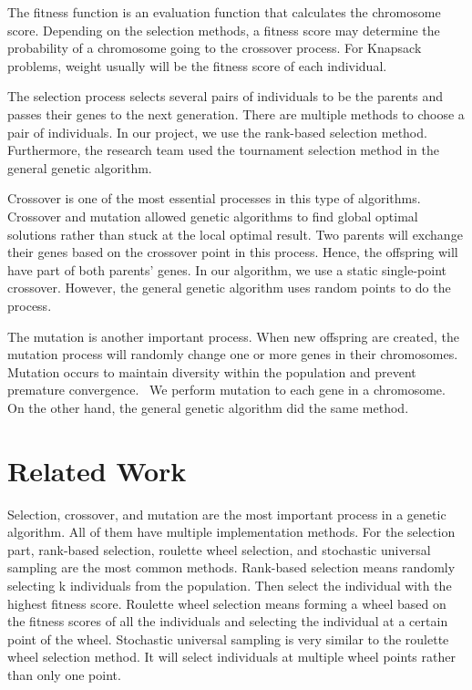 \documentclass[sigconf]{acmart}
\begin{document}
The fitness function is an evaluation function that calculates the chromosome score. Depending on the selection methods, a fitness score may determine the probability of a chromosome going to the crossover process. For Knapsack problems, weight usually will be the fitness score of each individual. 

The selection process selects several pairs of individuals to be the parents and passes their genes to the next generation. There are multiple methods to choose a pair of individuals. In our project, we use the rank-based selection method. Furthermore, the research team used the tournament selection method in the general genetic algorithm. 

Crossover is one of the most essential processes in this type of algorithms. Crossover and mutation allowed genetic algorithms to find global optimal solutions rather than stuck at the local optimal result. Two parents will exchange their genes based on the crossover point in this process. Hence, the offspring will have part of both parents' genes. In our algorithm, we use a static single-point crossover. However, the general genetic algorithm uses random points to do the process.

The mutation is another important process. When new offspring are created, the mutation process will randomly change one or more genes in their chromosomes. Mutation occurs to maintain diversity within the population and prevent premature convergence.~\cite{paper2} We perform mutation to each gene in a chromosome. On the other hand, the general genetic algorithm did the same method.


\section{Related Work}
\label{related}
Selection, crossover, and mutation are the most important process in a genetic algorithm. All of them have multiple implementation methods. For the selection part, rank-based selection, roulette wheel selection, and stochastic universal sampling are the most common methods. Rank-based selection means randomly selecting k individuals from the population. Then select the individual with the highest fitness score. Roulette wheel selection means forming a wheel based on the fitness scores of all the individuals and selecting the individual at a certain point of the wheel. Stochastic universal sampling is very similar to the roulette wheel selection method. It will select individuals at multiple wheel points rather than only one point. 
\end{document}
